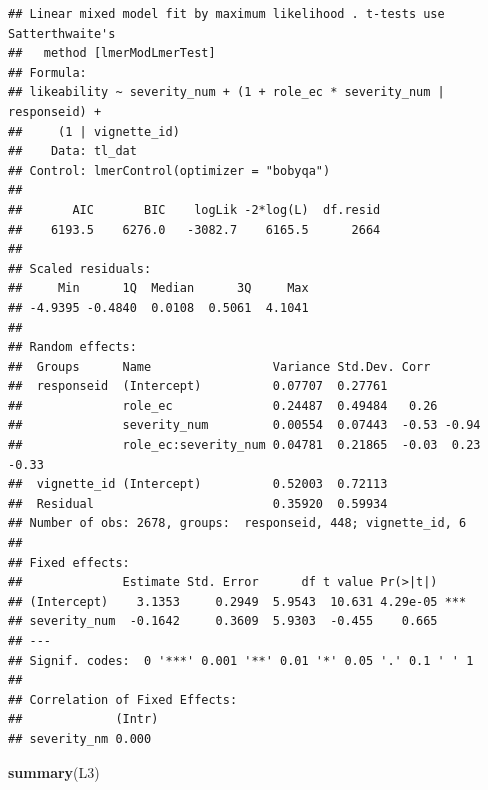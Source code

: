 \documentclass[
]{article}
\newenvironment{Shaded}{\begin{snugshade}}{\end{snugshade}}
\newcommand{\FunctionTok}[1]{\textcolor[rgb]{0.13,0.29,0.53}{\textbf{#1}}}
\newcommand{\NormalTok}[1]{#1}
\begin{document}
\begin{verbatim}
## Linear mixed model fit by maximum likelihood . t-tests use Satterthwaite's
##   method [lmerModLmerTest]
## Formula: 
## likeability ~ severity_num + (1 + role_ec * severity_num | responseid) +  
##     (1 | vignette_id)
##    Data: tl_dat
## Control: lmerControl(optimizer = "bobyqa")
## 
##       AIC       BIC    logLik -2*log(L)  df.resid 
##    6193.5    6276.0   -3082.7    6165.5      2664 
## 
## Scaled residuals: 
##     Min      1Q  Median      3Q     Max 
## -4.9395 -0.4840  0.0108  0.5061  4.1041 
## 
## Random effects:
##  Groups      Name                 Variance Std.Dev. Corr             
##  responseid  (Intercept)          0.07707  0.27761                   
##              role_ec              0.24487  0.49484   0.26            
##              severity_num         0.00554  0.07443  -0.53 -0.94      
##              role_ec:severity_num 0.04781  0.21865  -0.03  0.23 -0.33
##  vignette_id (Intercept)          0.52003  0.72113                   
##  Residual                         0.35920  0.59934                   
## Number of obs: 2678, groups:  responseid, 448; vignette_id, 6
## 
## Fixed effects:
##              Estimate Std. Error      df t value Pr(>|t|)    
## (Intercept)    3.1353     0.2949  5.9543  10.631 4.29e-05 ***
## severity_num  -0.1642     0.3609  5.9303  -0.455    0.665    
## ---
## Signif. codes:  0 '***' 0.001 '**' 0.01 '*' 0.05 '.' 0.1 ' ' 1
## 
## Correlation of Fixed Effects:
##             (Intr)
## severity_nm 0.000
\end{verbatim}

\begin{Shaded}
\begin{Highlighting}[]
\FunctionTok{summary}\NormalTok{(L3)}
\end{Highlighting}
\end{Shaded}
\end{document}
